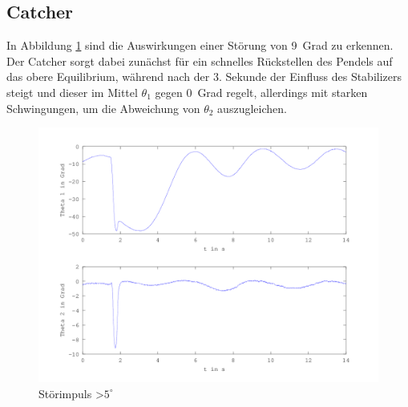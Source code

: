 \subsection{Catcher}
In Abbildung \ref{fig.Catcher-Plot} sind die Auswirkungen einer Störung von 9~Grad zu erkennen. Der Catcher sorgt dabei zunächst für ein schnelles Rückstellen des Pendels auf das obere Equilibrium, während nach der 3. Sekunde der Einfluss des Stabilizers steigt und dieser im Mittel $\theta_1$ gegen 0~Grad regelt, allerdings mit starken Schwingungen, um die Abweichung von $\theta_2$ auszugleichen. 
\begin{figure}[htbp]
	\centering
	\includegraphics[width=1.\textwidth]{Grafiken/Catch_kurz.png}
%
	\caption{Störimpuls \textgreater $5^{\circ}$}
	\label{fig.Catcher-Plot}
\end{figure}

